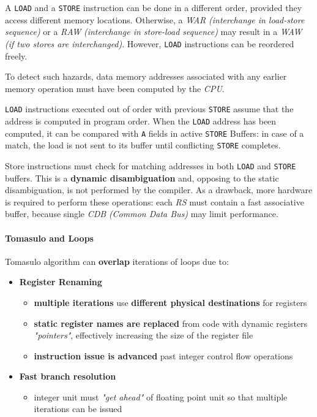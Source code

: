 \documentclass[english]{article}
\begin{document}
\bigskip
A \texttt{LOAD} and a \texttt{STORE} instruction can be done in a different order, provided they access different memory locations.
Otherwise, a \textit{WAR} \textit{(interchange in load-store sequence)} or a \textit{RAW} \textit{(interchange in store-load sequence)} may result in a  \textit{WAW} \textit{(if two stores are interchanged)}.
However, \texttt{LOAD} instructions can be reordered freely.

To detect such hazards, data memory addresses associated with any earlier memory operation must have been computed by the \textit{CPU}.

\bigskip
\texttt{LOAD} instructions executed out of order with previous \texttt{STORE} assume that the address is computed in program order.
When the \texttt{LOAD} address has been computed, it can be compared with \texttt{A} fields in active \texttt{STORE} Buffers: in case of a match, the load is not sent to its buffer until conflicting \texttt{STORE} completes.

Store instructions must check for matching addresses in both \texttt{LOAD} and \texttt{STORE} buffers.
This is a \textbf{dynamic disambiguation} and, opposing to the static disambiguation, is not performed by the compiler.
As a drawback, more hardware is required to perform these operations: each \textit{RS} must contain a fast associative buffer, because single \textit{CDB} \textit{(Common Data Bus)}  may limit performance.

\paragraph{Tomasulo and Loops}

Tomasulo algorithm can \textbf{overlap} iterations of loops due to:

\begin{itemize}
  \item \textbf{Register Renaming}
        \begin{itemize}
          \item \textbf{multiple iterations} use \textbf{different physical destinations} for registers
          \item \textbf{static register names are replaced} from code with dynamic registers \textit{"pointers"}, effectively increasing the size of the register file
          \item \textbf{instruction issue is advanced} past integer control flow operations
        \end{itemize}
  \item \textbf{Fast branch resolution}
        \begin{itemize}
          \item integer unit must \textit{"get ahead"} of floating point unit so that multiple iterations can be issued
        \end{itemize}
\end{itemize}
\end{document}
